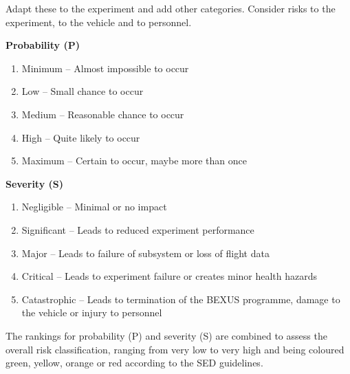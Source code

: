\documentclass[a4paper,12pt,twoside]{article}
\begin{document}
Adapt these to the experiment and add other categories. 
Consider risks to the experiment, to the vehicle and to personnel. 

\textbf{Probability (P)}
\begin{enumerate}[label=\Alph*]
    \item Minimum – Almost impossible to occur 
    \item Low – Small chance to occur 
    \item Medium – Reasonable chance to occur 
    \item High – Quite likely to occur 
    \item Maximum – Certain to occur, maybe more than once
\end{enumerate}

\textbf{Severity (S)}
\begin{enumerate}
    \item Negligible – Minimal or no impact 
    \item Significant – Leads to reduced experiment performance 
    \item Major – Leads to failure of subsystem or loss of flight data 
    \item Critical – Leads to experiment failure or creates minor health hazards 
    \item Catastrophic – Leads to termination of the BEXUS programme, damage to the vehicle or injury to personnel 
\end{enumerate}

The rankings for probability (P) and severity (S) are combined to assess the overall risk classification, ranging from very low to very high and being coloured green, yellow, orange or red according to the SED guidelines.
\end{document}
